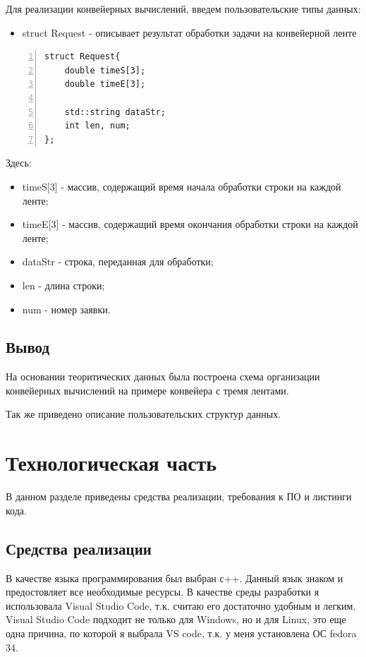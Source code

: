 \documentclass[12pt,a4paper]{report}
\begin{document}

Для реализации конвейерных вычислений, введем пользовательские типы данных:
\begin{itemize}
	\item struct Request - описывает результат обработки задачи на конвейерной ленте
\end{itemize}

\begin{lstlisting}[frame=single, numbers=left]
struct Request{	
	double timeS[3];
	double timeE[3];
	
	std::string dataStr;
	int len, num;
};	
\end{lstlisting}

Здесь:
\begin{itemize}
	\item timeS[3] - массив, содержащий время начала обработки строки на каждой ленте;
	\item timeE[3] - массив, содержащий время окончания обработки строки на каждой ленте;
	\item dataStr  - строка, переданная для обработки;
	\item len      - длина строки;
	\item num      - номер заявки.
\end{itemize}

\section*{Вывод}
На основании теоритических данных была построена схема организации конвейерных вычислений на примере конвейера с тремя лентами.

Так же приведено описание пользовательских структур данных.
\newpage
\chapter{Технологическая часть} 

В данном разделе приведены средства реализации, требования к ПО и листинги кода.

\section{Средства реализации}
В качестве языка программирования был выбран с++. Данный язык знаком и предостовляет все необходимые ресурсы.
В качестве среды разработки я использовала Visual Studio Code, т.к. считаю его достаточно удобным и легким.
Visual Studio Code подходит не только для  Windows, но и для Linux, это еще одна причина, по которой я выбрала VS code, т.к. у меня установлена ОС  fedora 34.
\end{document}

